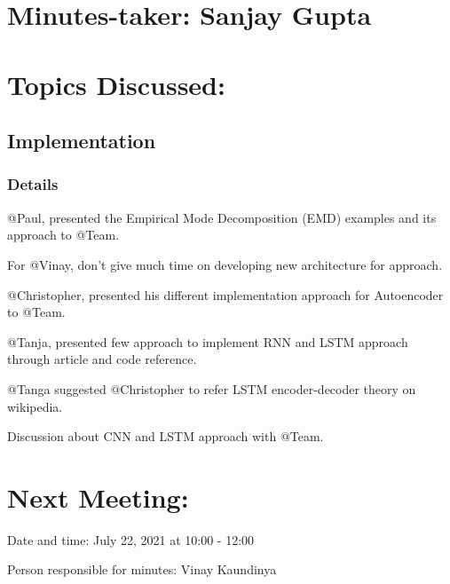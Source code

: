 \documentclass[11pt]{meetingmins} %
\begin{document}
\maketitle

\section{Minutes-taker: Sanjay Gupta}

\section{Topics Discussed:}

\subsection{Implementation}
\subsubsection{Details}
\begin{hiddensubitems}
    \item @Paul, presented the Empirical Mode Decomposition (EMD) examples and its approach to @Team.
    \item For @Vinay, don't give much time on developing new architecture for approach.
    \item @Christopher, presented his different implementation approach for Autoencoder to @Team.
    \item @Tanja, presented few approach to implement RNN and LSTM approach through article and code reference.
    \item @Tanga suggested @Christopher to refer LSTM encoder-decoder theory on wikipedia.
    \item Discussion about CNN and LSTM approach with @Team.
\end{hiddensubitems}

\section{Next Meeting:}
\begin{hiddensubitems}
    \item Date and time: July 22, 2021 at 10:00 - 12:00
    \item Person responsible for minutes: Vinay Kaundinya
\end{hiddensubitems}
\end{document}
